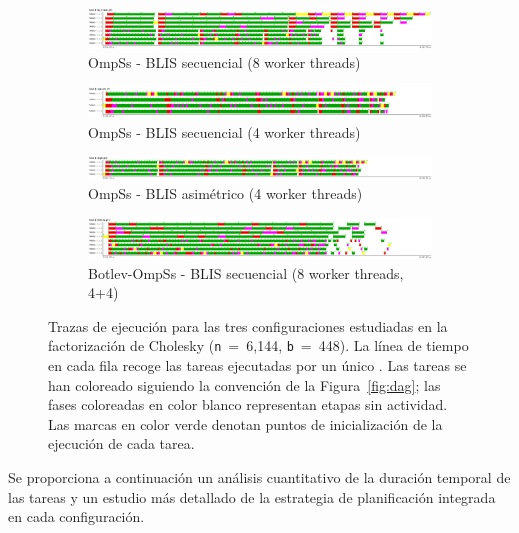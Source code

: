 \begin{figure}%
\centering
	\begin{subfigure}{\textwidth}
   \includegraphics[width=\textwidth]{Plots/Traces/sym_8cores_tasks.png}
		\caption{OmpSs - BLIS secuencial (8 worker threads)} 
	\end{subfigure}
	\begin{subfigure}{\textwidth}
   \includegraphics[width=\textwidth]{Plots/Traces/sym_tasks.png}
 \caption{OmpSs - BLIS secuencial (4 worker threads)} 
	\end{subfigure}
	\begin{subfigure}{\textwidth}
   \includegraphics[width=\textwidth]{Plots/Traces/asym_tasks.png}
		\caption{OmpSs - BLIS asimétrico (4 worker threads)}
	\end{subfigure}
	\begin{subfigure}{\textwidth}
   \includegraphics[width=\textwidth]{Plots/Traces/botlev_tasks.png}
		\caption{Botlev-OmpSs - BLIS secuencial (8 worker threads, 4+4)}
	\end{subfigure}
\caption{Trazas de ejecución para las tres configuraciones estudiadas en la factorización de Cholesky ({\tt n}~=~6,144, 
{\tt b}~=~448). 
La línea de tiempo en cada fila recoge las tareas ejecutadas por un único \wt.
Las tareas se han coloreado siguiendo la convención de la Figura~\ref{fig:dag};
las fases coloreadas en color blanco representan etapas sin actividad. Las marcas en color
	verde denotan puntos de inicialización de la ejecución de cada tarea.
}
\label{fig:traces_tasks}
\end{figure}


Se proporciona a continuación un análisis cuantitativo de la duración temporal de las tareas y un estudio
más detallado de la estrategia de planificación integrada en cada configuración.

